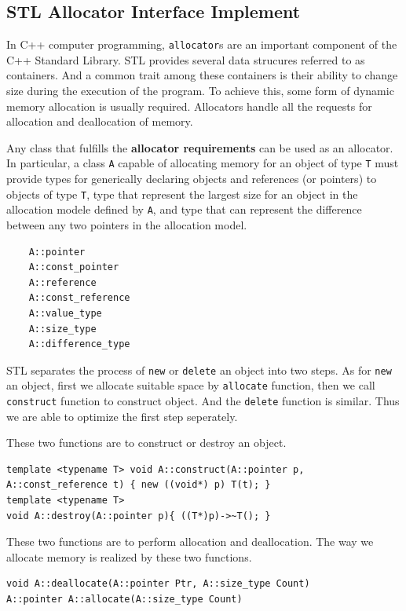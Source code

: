 \documentclass{article}
\begin{document}
\subsection{STL Allocator Interface Implement}

In C++ computer programming, \texttt{allocator}s are an important component of the C++ Standard Library. STL provides several data strucures referred to as containers. And a common trait among these containers is their ability to change size during the execution of the program. To achieve this, some form of dynamic memory allocation is usually required. Allocators handle all the requests for allocation and deallocation of memory.

Any class that fulfills the \textbf{allocator requirements} can be used as an allocator. In particular, a class \texttt{A} capable of allocating memory for an object of type \texttt{T}  must provide types for generically declaring objects and references (or pointers) to objects of type \texttt{T}, type that represent the largest size for an object in the allocation modele defined by \texttt{A}, and type that can represent the difference between any two pointers in the allocation model.
	\begin{lstlisting}
	A::pointer
	A::const_pointer
	A::reference
	A::const_reference
	A::value_type
	A::size_type
	A::difference_type
	\end{lstlisting}
STL separates the process of \texttt{new} or \texttt{delete} an object into two steps. As for \texttt{new} an object, first we allocate suitable space by \texttt{allocate} function, then we call \texttt{construct} function to construct object. And the \texttt{delete} function is similar. Thus we are able to optimize the first step seperately.

These two functions are to construct or destroy an object.  
\begin{lstlisting}
template <typename T> void A::construct(A::pointer p, A::const_reference t) { new ((void*) p) T(t); } 
template <typename T>
void A::destroy(A::pointer p){ ((T*)p)->~T(); } 
\end{lstlisting}
These two functions are to perform allocation and deallocation. The way we allocate memory is realized by these two functions. 

\begin{lstlisting}
void A::deallocate(A::pointer Ptr, A::size_type Count)
A::pointer A::allocate(A::size_type Count)
\end{lstlisting}
\end{document}
